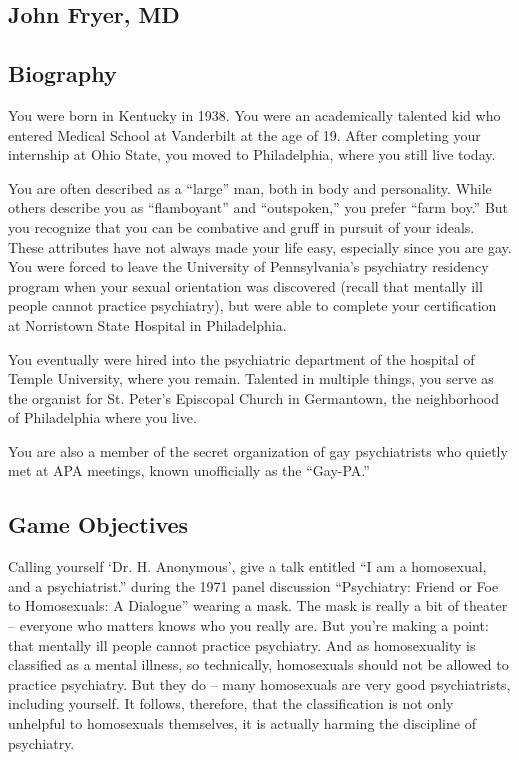 \begin{refsection}
\chapter{John Fryer, MD}
\label{johnfryermd}

\section{Biography}
\label{biography}

You were born in Kentucky in 1938. You were an academically talented kid who entered Medical School at Vanderbilt at the age of 19. After completing your internship at Ohio State, you moved to Philadelphia, where you still live today.

You are often described as a ``large'' man, both in body and personality. While others describe you as ``flamboyant'' and ``outspoken,'' you prefer ``farm boy.'' But you recognize that you can be combative and gruff in pursuit of your ideals. These attributes have not always made your life easy, especially since you are gay. You were forced to leave the University of Pennsylvania's psychiatry residency program when your sexual orientation was discovered (recall that mentally ill people cannot practice psychiatry), but were able to complete your certification at Norristown State Hospital in Philadelphia.

You eventually were hired into the psychiatric department of the hospital of Temple University, where you remain. Talented in multiple things, you serve as the organist for St. Peter's Episcopal Church in Germantown, the neighborhood of Philadelphia where you live.

You are also a member of the secret organization of gay psychiatrists who quietly met at APA meetings, known unofficially as the ``Gay-PA.''

\section{Game Objectives}
\label{gameobjectives}

Calling yourself `Dr. H. Anonymous', give a talk entitled ``I am a homosexual, and a psychiatrist.'' during the 1971 panel discussion ``Psychiatry: Friend or Foe to Homosexuals: A Dialogue'' wearing a mask. The mask is really a bit of theater – everyone who matters knows who you really are. But you're making a point: that mentally ill people cannot practice psychiatry. And as homosexuality is classified as a mental illness, so technically, homosexuals should not be allowed to practice psychiatry. But they do – many homosexuals are very good psychiatrists, including yourself. It follows, therefore, that the classification is not only unhelpful to homosexuals themselves, it is actually harming the discipline of psychiatry.


\end{refsection}
